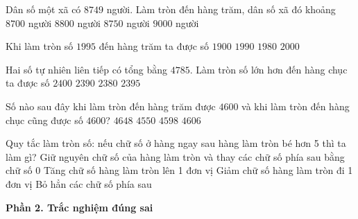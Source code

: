 \begin{ex} %
Dân số một xã có $8749$ người. Làm tròn đến hàng trăm, dân số xã đó khoảng
\choice
{\True $8700$ người}
{$8800$ người}
{$8750$ người}
{$9000$ người}
\end{ex}

\begin{ex} %
Khi làm tròn số $1995$ đến hàng trăm ta được số
\choice
{$1900$}
{$1990$}
{$1980$}
{\True $2000$}
\end{ex}

\begin{ex} %
Hai số tự nhiên liên tiếp có tổng bằng $4785$. Làm tròn số lớn hơn đến hàng chục ta được số
\choice
{$2400$}
{\True $2390$}
{$2380$}
{$2395$}
\end{ex}

\begin{ex} %
Số nào sau đây khi làm tròn đến hàng trăm được $4600$ và khi làm tròn đến hàng chục cũng được số $4600$?
\choice
{$4648$}
{$4550$}
{\True $4598$}
{$4606$}
\end{ex}

\begin{ex} %
Quy tắc làm tròn số: nếu chữ số ở hàng ngay sau hàng làm tròn bé hơn 5 thì ta làm gì?
\choice
{\True Giữ nguyên chữ số của hàng làm tròn và thay các chữ số phía sau bằng chữ số 0}
{Tăng chữ số hàng làm tròn lên 1 đơn vị}
{Giảm chữ số hàng làm tròn đi 1 đơn vị}
{Bỏ hẳn các chữ số phía sau}
\end{ex}

\textbf{Phần 2. Trắc nghiệm đúng sai}

